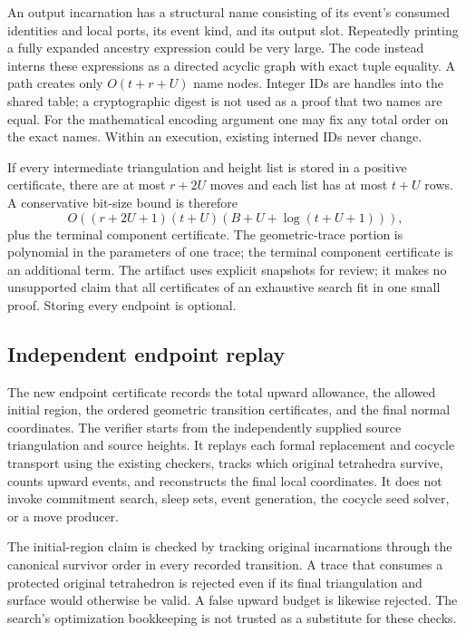 An output incarnation has a structural name consisting of its event's
consumed identities and local ports, its event kind, and its output slot.
Repeatedly printing a fully expanded ancestry expression could be very large.
The code instead interns these expressions as a directed acyclic graph with
exact tuple equality. A path creates only $O(t+r+U)$ name nodes. Integer IDs
are handles into the shared table; a cryptographic digest is not used as a
proof that two names are equal. For the mathematical encoding argument one
may fix any total order on the exact names. Within an execution, existing
interned IDs never change.

If every intermediate triangulation and height list is stored in a positive
certificate, there are at most $r+2U$ moves and each list has at most $t+U$
rows. A conservative bit-size bound is therefore
\begin{equation}\label{eq:trace-proof-size}
 O\!\left((r+2U+1)(t+U)
     (B+U+\log(t+U+1))\right),
\end{equation}
plus the terminal component certificate. The geometric-trace portion is
polynomial in the parameters of one trace; the terminal component
certificate is an additional term. The artifact uses explicit snapshots for review;
it makes no unsupported claim that all certificates of an exhaustive search
fit in one small proof. Storing every endpoint is optional.

\subsection{Independent endpoint replay}

The new endpoint certificate records the total upward allowance, the allowed
initial region, the ordered geometric transition certificates, and the final
normal coordinates. The verifier starts from the independently supplied
source triangulation and source heights. It replays each formal replacement
and cocycle transport using the existing checkers, tracks which original
tetrahedra survive, counts upward events, and reconstructs the final local
coordinates. It does not invoke commitment search, sleep sets, event generation,
the cocycle seed solver, or a move producer.

The initial-region claim is checked by tracking original incarnations through
the canonical survivor order in every recorded transition. A trace that
consumes a protected original tetrahedron is rejected even if its final
triangulation and surface would otherwise be valid. A false upward budget
is likewise rejected. The search's optimization bookkeeping is not trusted
as a substitute for these checks.

